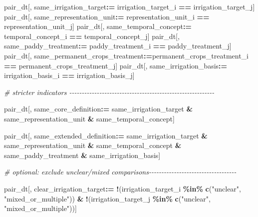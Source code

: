 \documentclass[
  11pt,
]{article}
\newenvironment{Shaded}{\begin{snugshade}}{\end{snugshade}}
\newcommand{\CommentTok}[1]{\textcolor[rgb]{0.56,0.35,0.01}{\textit{#1}}}
\newcommand{\FunctionTok}[1]{\textcolor[rgb]{0.13,0.29,0.53}{\textbf{#1}}}
\newcommand{\NormalTok}[1]{#1}
\newcommand{\SpecialCharTok}[1]{\textcolor[rgb]{0.81,0.36,0.00}{\textbf{#1}}}
\newcommand{\StringTok}[1]{\textcolor[rgb]{0.31,0.60,0.02}{#1}}
\begin{document}
\begin{Shaded}
\begin{Highlighting}[]
\NormalTok{pair\_dt[, same\_irrigation\_target}\SpecialCharTok{:=}\NormalTok{ irrigation\_target\_i }\SpecialCharTok{==}\NormalTok{ irrigation\_target\_j]}
\NormalTok{pair\_dt[, same\_representation\_unit}\SpecialCharTok{:=}\NormalTok{ representation\_unit\_i }\SpecialCharTok{==}\NormalTok{ representation\_unit\_j]}
\NormalTok{pair\_dt[, same\_temporal\_concept}\SpecialCharTok{:=}\NormalTok{ temporal\_concept\_i }\SpecialCharTok{==}\NormalTok{ temporal\_concept\_j]}
\NormalTok{pair\_dt[, same\_paddy\_treatment}\SpecialCharTok{:=}\NormalTok{ paddy\_treatment\_i }\SpecialCharTok{==}\NormalTok{ paddy\_treatment\_j]}
\NormalTok{pair\_dt[, same\_permanent\_crops\_treatment}\SpecialCharTok{:=}\NormalTok{permanent\_crops\_treatment\_i }\SpecialCharTok{==}\NormalTok{ permanent\_crops\_treatment\_j]}
\NormalTok{pair\_dt[, same\_irrigation\_basis}\SpecialCharTok{:=}\NormalTok{ irrigation\_basis\_i }\SpecialCharTok{==}\NormalTok{ irrigation\_basis\_j]}

\CommentTok{\# stricter indicators {-}{-}{-}{-}{-}{-}{-}{-}{-}{-}{-}{-}{-}{-}{-}{-}{-}{-}{-}{-}{-}{-}{-}{-}{-}{-}{-}{-}{-}{-}{-}{-}{-}{-}{-}{-}{-}{-}{-}{-}{-}{-}{-}{-}{-}{-}{-}{-}{-}{-}{-}{-}{-}{-}{-}{-}{-}{-}}

\NormalTok{pair\_dt[, same\_core\_definition}\SpecialCharTok{:=}\NormalTok{ same\_irrigation\_target }\SpecialCharTok{\&}\NormalTok{ same\_representation\_unit }\SpecialCharTok{\&}
\NormalTok{          same\_temporal\_concept]}

\NormalTok{pair\_dt[, same\_extended\_definition}\SpecialCharTok{:=}\NormalTok{ same\_irrigation\_target }\SpecialCharTok{\&}\NormalTok{ same\_representation\_unit }\SpecialCharTok{\&}
\NormalTok{          same\_temporal\_concept }\SpecialCharTok{\&}\NormalTok{ same\_paddy\_treatment }\SpecialCharTok{\&}\NormalTok{ same\_irrigation\_basis]}

\CommentTok{\# optional: exclude unclear/mixed comparisons{-}{-}{-}{-}{-}{-}{-}{-}{-}{-}{-}{-}{-}{-}{-}{-}{-}{-}{-}{-}{-}{-}{-}{-}{-}{-}{-}{-}{-}{-}{-}{-}{-}{-}{-}}

\NormalTok{pair\_dt[, clear\_irrigation\_target}\SpecialCharTok{:=}
          \SpecialCharTok{!}\NormalTok{(irrigation\_target\_i }\SpecialCharTok{\%in\%} \FunctionTok{c}\NormalTok{(}\StringTok{"unclear"}\NormalTok{, }\StringTok{"mixed\_or\_multiple"}\NormalTok{)) }\SpecialCharTok{\&}
          \SpecialCharTok{!}\NormalTok{(irrigation\_target\_j }\SpecialCharTok{\%in\%} \FunctionTok{c}\NormalTok{(}\StringTok{"unclear"}\NormalTok{, }\StringTok{"mixed\_or\_multiple"}\NormalTok{))]}


\end{Highlighting}
\end{Shaded}
\end{document}
